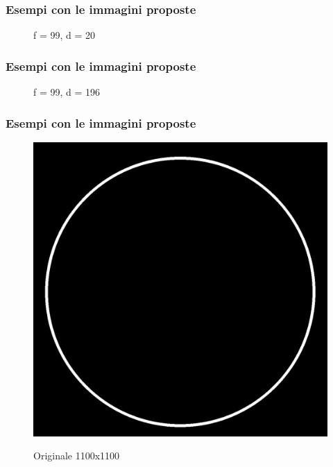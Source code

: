 \documentclass{beamer}
\begin{document}
\begin{frame}
	\frametitle{Esempi con le immagini proposte}
	\begin{figure}
		\caption{f = 99, d = 20}		
	\end{figure}
	
\end{frame}

\begin{frame}
	\frametitle{Esempi con le immagini proposte}
	\begin{figure}
		\caption{f = 99, d = 196}
	\end{figure}
	
\end{frame}

\begin{frame}
	\frametitle{Esempi con le immagini proposte}
	\begin{figure}
		{\includegraphics[width=.4\linewidth]{../images/circle.png}}
		\caption{Originale 1100x1100}
	\end{figure}	
\end{frame}
\end{document}
